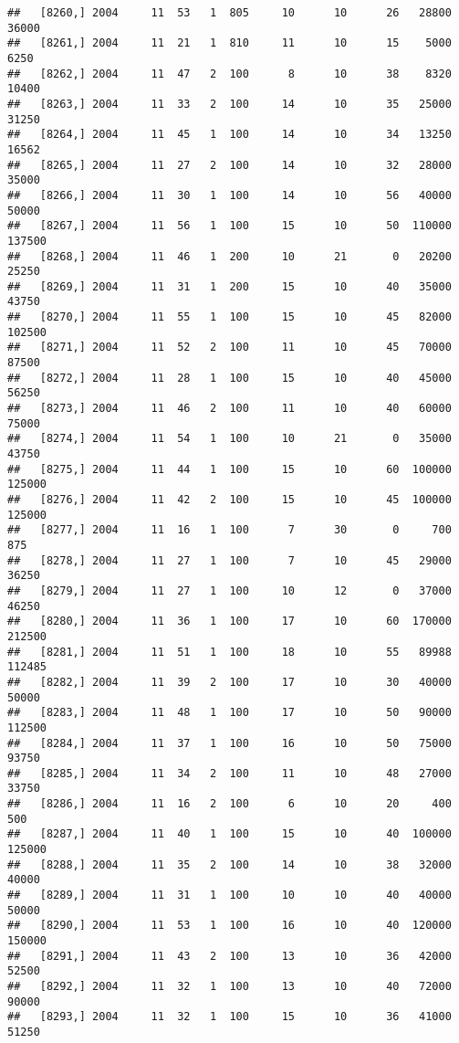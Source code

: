 \documentclass{article}\usepackage[]{graphicx}\usepackage[]{color}
\makeatletter
\newenvironment{kframe}{%
 \def\at@end@of@kframe{}%
 \ifinner\ifhmode%
  \def\at@end@of@kframe{\end{minipage}}%
  \begin{minipage}{\columnwidth}%
 \fi\fi%
 \def\FrameCommand##1{\hskip\@totalleftmargin \hskip-\fboxsep
 \colorbox{shadecolor}{##1}\hskip-\fboxsep
     \hskip-\linewidth \hskip-\@totalleftmargin \hskip\columnwidth}%
 \MakeFramed {\advance\hsize-\width
   \@totalleftmargin\z@ \linewidth\hsize
   \@setminipage}}%
 {\par\unskip\endMakeFramed%
 \at@end@of@kframe}
\newenvironment{knitrout}{}{} %
\makeatother
\begin{document}
\begin{knitrout}
\begin{kframe}
\begin{verbatim}
##   [8260,] 2004     11  53   1  805     10      10      26   28800   36000
##   [8261,] 2004     11  21   1  810     11      10      15    5000    6250
##   [8262,] 2004     11  47   2  100      8      10      38    8320   10400
##   [8263,] 2004     11  33   2  100     14      10      35   25000   31250
##   [8264,] 2004     11  45   1  100     14      10      34   13250   16562
##   [8265,] 2004     11  27   2  100     14      10      32   28000   35000
##   [8266,] 2004     11  30   1  100     14      10      56   40000   50000
##   [8267,] 2004     11  56   1  100     15      10      50  110000  137500
##   [8268,] 2004     11  46   1  200     10      21       0   20200   25250
##   [8269,] 2004     11  31   1  200     15      10      40   35000   43750
##   [8270,] 2004     11  55   1  100     15      10      45   82000  102500
##   [8271,] 2004     11  52   2  100     11      10      45   70000   87500
##   [8272,] 2004     11  28   1  100     15      10      40   45000   56250
##   [8273,] 2004     11  46   2  100     11      10      40   60000   75000
##   [8274,] 2004     11  54   1  100     10      21       0   35000   43750
##   [8275,] 2004     11  44   1  100     15      10      60  100000  125000
##   [8276,] 2004     11  42   2  100     15      10      45  100000  125000
##   [8277,] 2004     11  16   1  100      7      30       0     700     875
##   [8278,] 2004     11  27   1  100      7      10      45   29000   36250
##   [8279,] 2004     11  27   1  100     10      12       0   37000   46250
##   [8280,] 2004     11  36   1  100     17      10      60  170000  212500
##   [8281,] 2004     11  51   1  100     18      10      55   89988  112485
##   [8282,] 2004     11  39   2  100     17      10      30   40000   50000
##   [8283,] 2004     11  48   1  100     17      10      50   90000  112500
##   [8284,] 2004     11  37   1  100     16      10      50   75000   93750
##   [8285,] 2004     11  34   2  100     11      10      48   27000   33750
##   [8286,] 2004     11  16   2  100      6      10      20     400     500
##   [8287,] 2004     11  40   1  100     15      10      40  100000  125000
##   [8288,] 2004     11  35   2  100     14      10      38   32000   40000
##   [8289,] 2004     11  31   1  100     10      10      40   40000   50000
##   [8290,] 2004     11  53   1  100     16      10      40  120000  150000
##   [8291,] 2004     11  43   2  100     13      10      36   42000   52500
##   [8292,] 2004     11  32   1  100     13      10      40   72000   90000
##   [8293,] 2004     11  32   1  100     15      10      36   41000   51250

\end{verbatim}
\end{kframe}
\end{knitrout}
\end{document}
